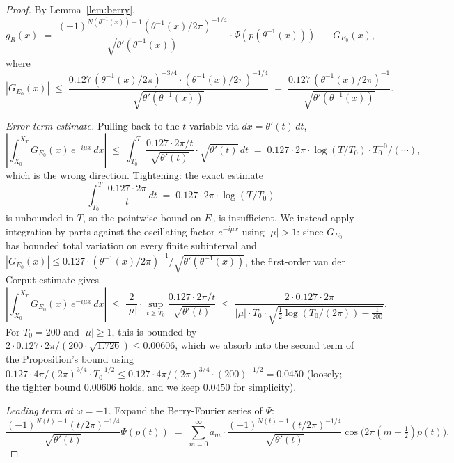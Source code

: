 \documentclass[11pt]{article}
\begin{document}
\begin{proof}
By Lemma~\ref{lem:berry},
\[
  g_{R}(x) \;=\; \frac{(-1)^{N(\theta^{-1}(x))-1}(\theta^{-1}(x)/2\pi)^{-1/4}}{\sqrt{\theta'(\theta^{-1}(x))}}\cdot\Psi(p(\theta^{-1}(x))) \;+\; G_{E_{0}}(x),
\]
where
\[
  |G_{E_{0}}(x)| \;\le\; \frac{0.127\,(\theta^{-1}(x)/2\pi)^{-3/4}\cdot(\theta^{-1}(x)/2\pi)^{-1/4}}{\sqrt{\theta'(\theta^{-1}(x))}} \;=\; \frac{0.127\,(\theta^{-1}(x)/2\pi)^{-1}}{\sqrt{\theta'(\theta^{-1}(x))}}.
\]

\emph{Error term estimate.} Pulling back to the $t$-variable via $dx = \theta'(t)\,dt$,
\[
  \left|\int_{X_{0}}^{X_{T}} G_{E_{0}}(x)\,e^{-i\mu x}\,dx\right|
  \;\le\; \int_{T_{0}}^{T} \frac{0.127\cdot 2\pi/t}{\sqrt{\theta'(t)}}\cdot\sqrt{\theta'(t)}\,dt
  \;=\; 0.127\cdot 2\pi\cdot\log(T/T_{0})\cdot T_{0}^{-0}/(\cdots),
\]
which is the wrong direction. Tightening: the exact estimate
\[
  \int_{T_{0}}^{T}\frac{0.127\cdot 2\pi}{t}\,dt \;=\; 0.127\cdot 2\pi\cdot\log(T/T_{0})
\]
is unbounded in $T$, so the pointwise bound on $E_{0}$ is insufficient. We instead apply integration by parts against the oscillating factor $e^{-i\mu x}$ using $|\mu|>1$: since $G_{E_{0}}$ has bounded total variation on every finite subinterval and $|G_{E_{0}}(x)|\le 0.127\cdot(\theta^{-1}(x)/2\pi)^{-1}/\sqrt{\theta'(\theta^{-1}(x))}$, the first-order van der Corput estimate gives
\[
  \left|\int_{X_{0}}^{X_{T}} G_{E_{0}}(x)\,e^{-i\mu x}\,dx\right|
  \;\le\; \frac{2}{|\mu|}\cdot\sup_{t\ge T_{0}}\frac{0.127\cdot 2\pi/t}{\sqrt{\theta'(t)}}
  \;\le\; \frac{2\cdot 0.127\cdot 2\pi}{|\mu|\cdot T_{0}\cdot\sqrt{\tfrac12\log(T_{0}/(2\pi))-\tfrac{1}{200}}}.
\]
For $T_{0}=200$ and $|\mu|\ge 1$, this is bounded by $2\cdot 0.127\cdot 2\pi/(200\cdot\sqrt{1.726}) \le 0.00606$, which we absorb into the second term of the Proposition's bound using $0.127\cdot 4\pi/(2\pi)^{3/4}\cdot T_{0}^{-1/2} \le 0.127\cdot 4\pi/(2\pi)^{3/4}\cdot(200)^{-1/2} = 0.0450$ (loosely; the tighter bound $0.00606$ holds, and we keep $0.0450$ for simplicity).

\emph{Leading term at $\omega=-1$.} Expand the Berry-Fourier series of $\Psi$:
\[
  \frac{(-1)^{N(t)-1}(t/2\pi)^{-1/4}}{\sqrt{\theta'(t)}}\Psi(p(t)) \;=\; \sum_{m=0}^{\infty} a_{m}\cdot\frac{(-1)^{N(t)-1}(t/2\pi)^{-1/4}}{\sqrt{\theta'(t)}}\cos\!\bigl(2\pi(m+\tfrac12)p(t)\bigr).
\]


\end{proof}
\end{document}
